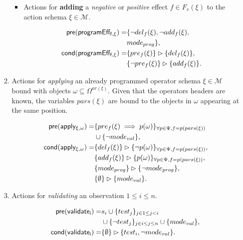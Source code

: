 \documentclass{article}
\newcommand{\pre}{\mathsf{pre}}     %
\newcommand{\cond}{\mathsf{cond}}   %
\begin{document}
\begin{itemize}
\begin{enumerate}
\begin{itemize}
\item Actions for {\bf adding} a {\em negative} or {\em positive} effect $f\in F_v(\xi)$ to the action schema $\xi\in\mathcal{M}$.

\begin{small}
\begin{align*}
\hspace*{7pt}\pre(\mathsf{programEff_{f,\xi}})=&\{\neg del_{f}(\xi),\neg add_{f}(\xi),\\
& mode_{prog}\},\\
\cond(\mathsf{programEff_{f,\xi}})=&\{pre_{f}(\xi)\}\rhd\{del_{f}(\xi)\},\\
&\{\neg pre_{f}(\xi)\}\rhd\{add_{f}(\xi)\}.
\end{align*}
\end{small}
\end{itemize}

\item Actions for {\em applying} an already programmed operator schema $\xi\in\mathcal{M}$ bound with objects $\omega\subseteq\Omega^{ar(\xi)}$. Given that the operators headers are known, the variables $pars(\xi)$ are bound to the objects in $\omega$ appearing at the same position.
\begin{small}
\begin{align*}
\hspace*{7pt}\pre(\mathsf{apply_{\xi,\omega}})=&\{pre_{f}(\xi)\implies p(\omega)\}_{\forall p\in\Psi,f=p(pars(\xi))}\\
&\cup \{\neg mode_{val}\},\\
\cond(\mathsf{apply_{\xi,\omega}})=&\{del_{f}(\xi)\}\rhd\{\neg p(\omega)\}_{\forall p\in\Psi,f=p(pars(\xi))},\\
&\{add_{f}(\xi)\}\rhd\{p(\omega)\}_{\forall p\in\Psi,f=p(pars(\xi))},\\
&\{mode_{prog}\}\rhd\{\neg mode_{prog}\},\\
&\{\emptyset\}\rhd\{mode_{val}\}.
\end{align*}
\end{small}

\item Actions for {\em validating} an observation {\tt\small $1\leq i\leq n$}.
\begin{small}
\begin{align*}
\hspace*{7pt}\pre(\mathsf{validate_{i}})=&s_i\cup\{test_j\}_{j\in 1\leq j<i}\\
&\cup\{\neg test_j\}_{j\in i\leq j\leq n}\cup \{mode_{val}\},\\
\cond(\mathsf{validate_{i}})=&\{\emptyset\}\rhd\{test_i,\neg mode_{val}\}.
\end{align*}
\end{small}
\end{enumerate}
\end{itemize}
\end{document}
